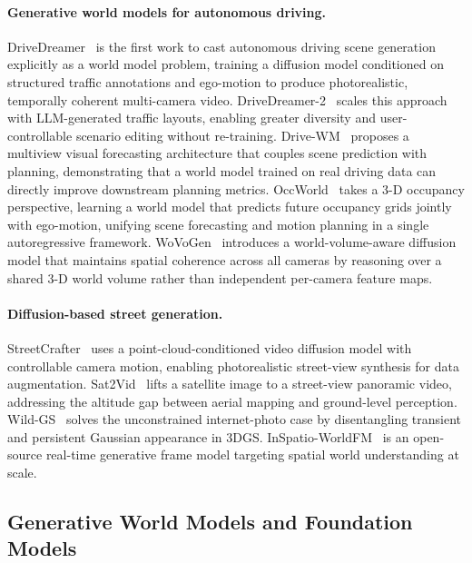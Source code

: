 \paragraph{Generative world models for autonomous driving.}
DriveDreamer~\citep{wang2023drivedreamer} is the first work to cast
autonomous driving scene generation explicitly as a world model problem,
training a diffusion model conditioned on structured traffic annotations and
ego-motion to produce photorealistic, temporally coherent multi-camera video.
DriveDreamer-2~\citep{zhao2024drivedreamer2} scales this approach with
LLM-generated traffic layouts, enabling greater diversity and user-controllable
scenario editing without re-training.
Drive-WM~\citep{wang2023drive_wm} proposes a multiview visual forecasting
architecture that couples scene prediction with planning, demonstrating
that a world model trained on real driving data can directly improve downstream
planning metrics.
OccWorld~\citep{zheng2024occworld} takes a 3-D occupancy perspective,
learning a world model that predicts future occupancy grids jointly with
ego-motion, unifying scene forecasting and motion planning in a single
autoregressive framework.
WoVoGen~\citep{lu2023wovogen} introduces a world-volume-aware diffusion model
that maintains spatial coherence across all cameras by reasoning over a
shared 3-D world volume rather than independent per-camera feature maps.

\paragraph{Diffusion-based street generation.}
StreetCrafter~\citep{yan2024streetcrafter} uses a point-cloud-conditioned video
diffusion model with controllable camera motion, enabling photorealistic
street-view synthesis for data augmentation.
Sat2Vid~\citep{wu2022sat2vid} lifts a satellite image to a street-view
panoramic video, addressing the altitude gap between aerial mapping and
ground-level perception.
Wild-GS~\citep{xu2024wildgs} solves the unconstrained internet-photo case by
disentangling transient and persistent Gaussian appearance in 3DGS.
InSpatio-WorldFM~\citep{chen2025inspatioworld} is an open-source real-time
generative frame model targeting spatial world understanding at scale.

\subsection{Generative World Models and Foundation Models}


